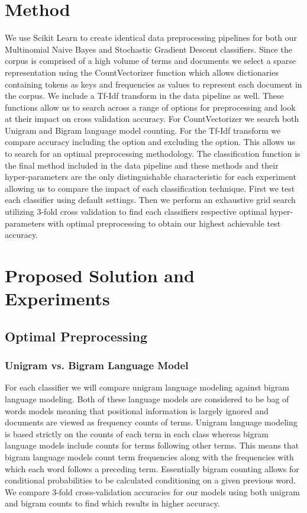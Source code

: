 \documentclass[a4paper, 12pt]{article}
\begin{document}
\section{Method}
We use \cite{pedregosa2011scikit} Scikit Learn to create identical data preprocessing pipelines for both our Multinomial Naive Bayes and Stochastic Gradient Descent classifiers.  Since the corpus is comprised of a high volume of terms and documents we select a sparse representation using the CountVectorizer function which allows dictionaries containing tokens as keys and frequencies as values to represent each document in the corpus. We include a Tf-Idf transform in the data pipeline as well. These functions allow us to search across a range of options for preprocessing and look at their impact on cross validation accuracy.  For CountVectorizer we search both Unigram and Bigram language model counting. For the Tf-Idf transform we compare accuracy including the option and excluding the option. This allows us to search for an optimal preprocessing methodology. The classification function is the final method included in the data pipeline and these methods and their hyper-parameters are the only distinguishable characteristic for each experiment allowing us to compare the impact of each classification technique. First we test each classifier using default settings. Then we perform an exhaustive grid search utilizing 3-fold cross validation to find each classifiers respective optimal hyper-parameters with optimal preprocessing to obtain our highest achievable test accuracy. \\

\section{Proposed Solution and Experiments}
\subsection{Optimal Preprocessing}
\subsubsection{Unigram vs. Bigram Language Model}
For each classifier we will compare unigram language modeling against bigram language modeling. Both of these language models are considered to be bag of words models meaning that positional information is largely ignored and documents are viewed as frequency counts of terms. Unigram language modeling is based strictly on the counts of each term in each class whereas bigram language models include counts for terms following other terms. This means that bigram language models count term frequencies along with the frequencies with which each word follows a preceding term. Essentially bigram counting allows for conditional probabilities to be calculated conditioning on a given previous word.  We compare 3-fold cross-validation accuracies for our models using both unigram and bigram counts to find which results in higher accuracy.
\end{document}
